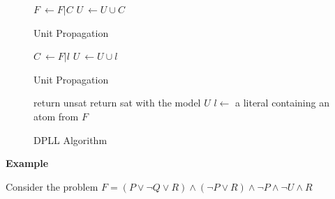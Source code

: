 \documentclass[]{final_report}
\begin{document}
\begin{figure}[h]
\begin{algorithmic}
		\State $\mathit{F}~\gets \mathit{F}|C$
		\State $U~\gets U \cup {C}$
	\EndWhile
\EndFunction    
\end{algorithmic}

\caption{\label{fig:dppl-unit-propagate} Unit Propagation}
\end{figure}


\begin{figure}[h]
\begin{algorithmic}
		\State $C~\gets \mathit{F}|l$
		\State $U~\gets U \cup {l}$
	\EndWhile
\EndFunction    
\end{algorithmic}

\caption{\label{fig:dppl-pure-literal} Unit Propagation}
\end{figure}

\begin{figure}[h]

\begin{algorithmic}
	\State {}
		\State return unsat
	\EndIf
	\State {}
		\State return sat with the model $U$
	\EndIf
	\State $l \gets$ a literal containing an atom from $\mathit{F}$
	\State {}
	\State {}
\EndFunction    
\end{algorithmic}
\caption{\label{fig:dppl-classic-algo} DPLL Algorithm}
\end{figure}

\textbf{Example}

Consider the problem $F = (P \lor \lnot{Q} \lor R) \land (\lnot{P} \lor R) \land \lnot{P} \land \lnot{U} \land {R}$
\end{document}
